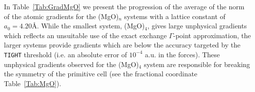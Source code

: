 \documentclass[prl,twocolumn,showpacs,twocolumngrid,superbib]{revtex4}
\begin{document}
%
%
%
%
%
%
%
%
%
%
%
%
%
In Table~\ref{Tab:GradMgO} we present the progression of the average of the norm of the
atomic gradients for the (MgO)$_n$ systems with a lattice constant of $a_0=4.20$\AA. 
While the smallest system, (MgO)$_4$, gives 
large unphysical gradients which reflects 
an unsuitable use of the exact exchange $\Gamma$-point approximation,
the larger systems provide gradients which are below the accuracy targeted by the 
{\tt TIGHT} threshold (i.e. an absolute error of $10^{-4}$ a.u. in the forces).
These unphysical gradients observed for the (MgO)$_4$ system are responsible for
breaking the symmetry of the primitive cell (see the fractional coordinate Table~\ref{Tab:MgO}).
\end{document}
